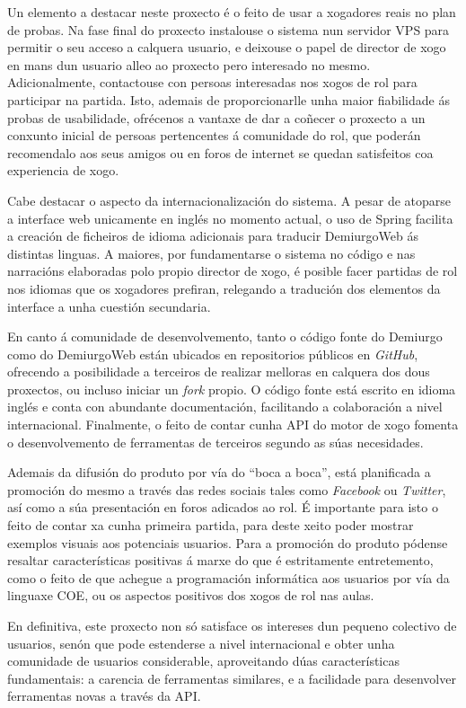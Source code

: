 Un elemento a destacar neste proxecto é o feito de usar a xogadores reais no
plan de probas. Na fase final do proxecto instalouse o sistema nun servidor VPS
para permitir o seu acceso a calquera usuario, e deixouse o papel de director de
xogo en mans dun usuario alleo ao proxecto pero interesado no mesmo.
Adicionalmente, contactouse con persoas interesadas nos xogos de rol para
participar na partida. Isto, ademais de proporcionarlle unha maior fiabilidade
ás probas de usabilidade, ofrécenos a vantaxe de dar a coñecer o proxecto a un
conxunto inicial de persoas pertencentes á comunidade do rol, que poderán
recomendalo aos seus amigos ou en foros de internet se quedan satisfeitos coa
experiencia de xogo.

Cabe destacar o aspecto da internacionalización do sistema. A pesar de atoparse
a interface web unicamente en inglés no momento actual, o uso de Spring facilita
a creación de ficheiros de idioma adicionais para traducir DemiurgoWeb ás
distintas linguas. A maiores, por fundamentarse o sistema no código e nas
narracións elaboradas polo propio director de xogo, é posible facer partidas de
rol nos idiomas que os xogadores prefiran, relegando a tradución dos elementos
da interface a unha cuestión secundaria.

En canto á comunidade de desenvolvemento, tanto o código fonte do Demiurgo como
do DemiurgoWeb están ubicados en repositorios públicos en \textit{GitHub},
ofrecendo a posibilidade a terceiros de realizar melloras en calquera dos dous
proxectos, ou incluso iniciar un \textit{fork} propio. O código fonte está
escrito en idioma inglés e conta con abundante documentación, facilitando a
colaboración a nivel internacional. Finalmente, o feito de contar cunha API do
motor de xogo fomenta o desenvolvemento de ferramentas de terceiros segundo as
súas necesidades.

Ademais da difusión do produto por vía do ``boca a boca'', está planificada a
promoción do mesmo a través das redes sociais tales como \textit{Facebook} ou
\textit{Twitter}, así como a súa presentación en foros adicados ao rol. É
importante para isto o feito de contar xa cunha primeira partida, para deste
xeito poder mostrar exemplos visuais aos potenciais usuarios. Para a promoción
do produto pódense resaltar características positivas á marxe do que é
estritamente entretemento, como o feito de que achegue a programación
informática aos usuarios por vía da linguaxe COE, ou os aspectos positivos dos
xogos de rol nas aulas.

En definitiva, este proxecto non só satisface os intereses dun pequeno colectivo
de usuarios, senón que pode estenderse a nivel internacional e obter unha
comunidade de usuarios considerable, aproveitando dúas características
fundamentais: a carencia de ferramentas similares, e a facilidade para
desenvolver ferramentas novas a través da API.